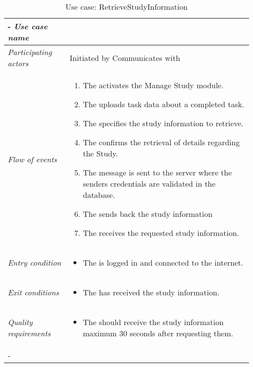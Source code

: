 
%



%
%
\begin{table}[H]
\tabulinesep=1.5mm
\begin{tabu} to 
	\tabucline[1.5pt]-
	\textit{Use case name} & \RetrieveStudyInformation \\
	\hline
	\textit{Participating actors} & Initiated by \client \newline Communicates with \serverside \\
	\hline
	\textit{Flow of events} &
	\vspace{-3mm}
	\begin{enumerate}[leftmargin=*,topsep=0pt,itemsep=-1ex]
		\item The \client activates the Manage Study module.
		\item The \client uploads task data about a completed task.
		\item The \client specifies the study information to retrieve.
		\item The \client confirms the retrieval of details regarding the Study. \newline
		\setlength{\itemindent}{2cm}
				\item \parbox[t]{\linewidth-\itemindent}{The message is sent to the server where the senders credentials are validated in the database.}
		\setlength{\itemindent}{2cm}
				\item \parbox[t]{\linewidth-\itemindent}{The \serverside sends back the study information}
		\item The \client receives the requested study information.
		
				
	\end{enumerate} \\
	\hline
	\textit{Entry condition} &
	\vspace{-3mm}
	\begin{itemize}[leftmargin=*,topsep=0pt,itemsep=-1ex]
		\item The \client is logged in and connected to the internet.
	\end{itemize} \\
	\hline
	\textit{Exit conditions} &
	\vspace{-3mm}
	\begin{itemize}[leftmargin=*,topsep=0pt,itemsep=-1ex]
		\item The \client has received the study information.
	\end{itemize} \\
	\hline
	\textit{Quality \newline requirements} &
	\vspace{-3mm}
	\begin{itemize}[leftmargin=*,topsep=0pt,itemsep=-1ex]
		\item The \client should receive the study information maximum 30 seconds after requesting them.
	\end{itemize} \\
	\tabucline[1.5pt]-
\end{tabu}
\caption{Use case: RetrieveStudyInformation}
\label{uc:RetrieveStudyInformation}
\end{table}